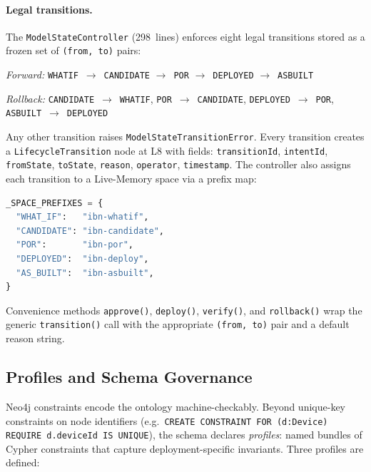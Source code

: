 \documentclass[acmtog]{acmart}
\renewcommand\_{\textunderscore\allowbreak}
\begin{document}
\paragraph{Legal transitions.}
The \texttt{ModelStateController} (298~lines) enforces eight legal
transitions stored as a frozen set of \texttt{(from, to)} pairs:

\medskip
\noindent\textit{Forward:}
\texttt{WHAT\_IF}~$\rightarrow$~\texttt{CANDIDATE}
$\rightarrow$~\texttt{POR}
$\rightarrow$~\texttt{DEPLOYED}
$\rightarrow$~\texttt{AS\_BUILT}

\noindent\textit{Rollback:}
\texttt{CANDIDATE}~$\rightarrow$~\texttt{WHAT\_IF},
\texttt{POR}~$\rightarrow$~\texttt{CANDIDATE},
\texttt{DEPLOYED}~$\rightarrow$~\texttt{POR},
\texttt{AS\_BUILT}~$\rightarrow$~\texttt{DEPLOYED}
\medskip

Any other transition raises \texttt{ModelStateTransitionError}.
Every transition creates a \texttt{LifecycleTransition} node at L8
with fields: \texttt{transitionId}, \texttt{intentId},
\texttt{fromState}, \texttt{toState}, \texttt{reason},
\texttt{operator}, \texttt{timestamp}. The controller also assigns
each transition to a Live-Memory space via a prefix map:

\begin{lstlisting}[language=Python,caption={Live-Memory space prefix per model state.}]
_SPACE_PREFIXES = {
  "WHAT_IF":   "ibn-whatif",
  "CANDIDATE": "ibn-candidate",
  "POR":       "ibn-por",
  "DEPLOYED":  "ibn-deploy",
  "AS_BUILT":  "ibn-asbuilt",
}
\end{lstlisting}

Convenience methods \texttt{approve()}, \texttt{deploy()},
\texttt{verify()}, and \texttt{rollback()} wrap the generic
\texttt{transition()} call with the appropriate \texttt{(from, to)}
pair and a default reason string.


\subsection{Profiles and Schema Governance}\label{sec:ssot:profiles}

Neo4j constraints encode the ontology machine-checkably. Beyond
unique-key constraints on node identifiers (e.g.\
\texttt{CREATE CONSTRAINT FOR (d:Device) REQUIRE d.deviceId IS
UNIQUE}), the schema declares \emph{profiles}: named bundles of
Cypher constraints that capture deployment-specific invariants.
Three profiles are defined:
\end{document}
